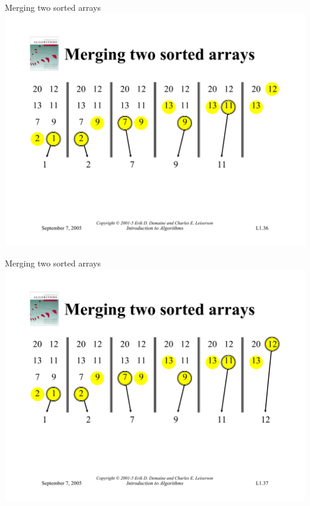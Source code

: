 \documentclass{beamer}
\begin{document}
\begin{frame}{Merging two sorted arrays}
    \centering
    \includegraphics[width=\textwidth, trim={1.1cm 6cm 1.1cm 4.95cm}, clip]{pages/lec1_36}
\end{frame}
\begin{frame}{Merging two sorted arrays}
    \centering
    \includegraphics[width=\textwidth, trim={1.1cm 6cm 1.1cm 4.95cm}, clip]{pages/lec1_37}
\end{frame}
\end{document}
